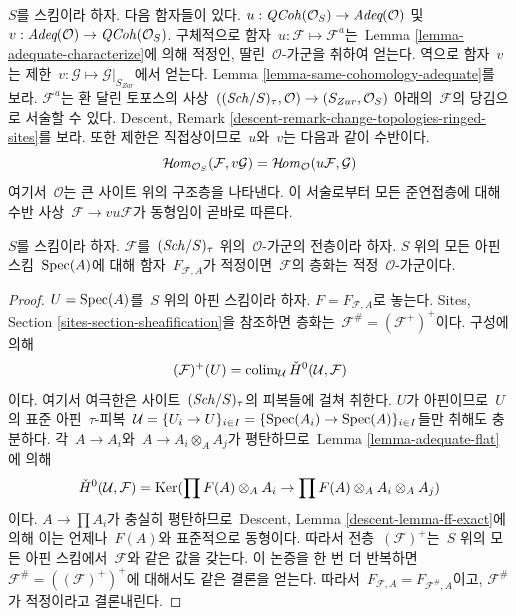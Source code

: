 \begin{remark}
\label{remark-compare}
$S$를 스킴이라 하자. 다음 함자들이 있다.
$u : \mathit{QCoh}(\mathcal{O}_S) \to \textit{Adeq}(\mathcal{O})$
및\ 
$v : \textit{Adeq}(\mathcal{O}) \to \mathit{QCoh}(\mathcal{O}_S)$.
구체적으로 함자\  $u : \mathcal{F} \mapsto \mathcal{F}^a$는\ 
Lemma \ref{lemma-adequate-characterize}에 의해 적정인, 딸린\ 
$\mathcal{O}$-가군을 취하여 얻는다. 역으로 함자\  $v$는 제한\ 
$v : \mathcal{G} \mapsto \mathcal{G}|_{S_{Zar}}$에서 얻는다.
Lemma \ref{lemma-same-cohomology-adequate}를 보라.
$\mathcal{F}^a$는 환 달린 토포스의 사상\ 
$((\mathit{Sch}/S)_\tau, \mathcal{O}) \to (S_{Zar}, \mathcal{O}_S)$ 아래의\ 
$\mathcal{F}$의 당김으로 서술할 수 있다. Descent, Remark
\ref{descent-remark-change-topologies-ringed-sites}를 보라. 또한 제한은
직접상이므로\  $u$와\  $v$는 다음과 같이 수반이다.
$$
\mathop{\mathcal{H}\!\mathit{om}}\nolimits_{\mathcal{O}_S}(\mathcal{F}, v\mathcal{G})
=
\mathop{\mathcal{H}\!\mathit{om}}\nolimits_\mathcal{O}(u\mathcal{F}, \mathcal{G})
$$
여기서\  $\mathcal{O}$는 큰 사이트 위의 구조층을 나타낸다. 이 서술로부터
모든 준연접층에 대해 수반 사상\ 
$\mathcal{F} \to vu\mathcal{F}$가 동형임이 곧바로 따른다.
\end{remark}

\begin{lemma}
\label{lemma-sheafification-adequate}
$S$를 스킴이라 하자. $\mathcal{F}$를\  $(\mathit{Sch}/S)_\tau$ 위의\ 
$\mathcal{O}$-가군의 전층이라 하자. $S$ 위의 모든 아핀 스킴\ 
$\mathop{\mathrm{Spec}}(A)$에 대해 함자\  $F_{\mathcal{F}, A}$가 적정이면\ 
$\mathcal{F}$의 층화는 적정\  $\mathcal{O}$-가군이다.
\end{lemma}

\begin{proof}
$U = \mathop{\mathrm{Spec}}(A)$를\  $S$ 위의 아핀 스킴이라 하자.
$F = F_{\mathcal{F}, A}$로 놓는다. Sites, Section
\ref{sites-section-sheafification}을 참조하면 층화는\ 
$\mathcal{F}^\# = (\mathcal{F}^+)^+$이다. 구성에 의해
$$
(\mathcal{F})^+(U) =
\mathop{\mathrm{colim}}\nolimits_\mathcal{U} \check{H}^0(\mathcal{U}, \mathcal{F})
$$
이다. 여기서 여극한은 사이트\  $(\mathit{Sch}/S)_\tau$의 피복들에 걸쳐
취한다. $U$가 아핀이므로\  $U$의 표준 아핀\  $\tau$-피복\ 
$\mathcal{U} = \{U_i \to U\}_{i \in I} =
\{\mathop{\mathrm{Spec}}(A_i) \to \mathop{\mathrm{Spec}}(A)\}_{i \in I}$들만 취해도 충분하다.
각\  $A \to A_i$와\  $A \to A_i \otimes_A A_j$가 평탄하므로\  Lemma
\ref{lemma-adequate-flat}에 의해
$$
\check{H}^0(\mathcal{U}, \mathcal{F}) =
\mathop{\mathrm{Ker}}(\prod F(A) \otimes_A A_i \to \prod F(A) \otimes_A A_i \otimes_A A_j)
$$
이다. $A \to \prod A_i$가 충실히 평탄하므로\  Descent, Lemma
\ref{descent-lemma-ff-exact}에 의해 이는 언제나\  $F(A)$와 표준적으로
동형이다. 따라서 전층\  $(\mathcal{F})^+$는\  $S$ 위의 모든 아핀
스킴에서\  $\mathcal{F}$와 같은 값을 갖는다. 이 논증을 한 번 더
반복하면\  $\mathcal{F}^\# = ((\mathcal{F})^+)^+$에 대해서도 같은
결론을 얻는다. 따라서\ 
$F_{\mathcal{F}, A} = F_{\mathcal{F}^\#, A}$이고,
$\mathcal{F}^\#$가 적정이라고 결론내린다.
\end{proof}

